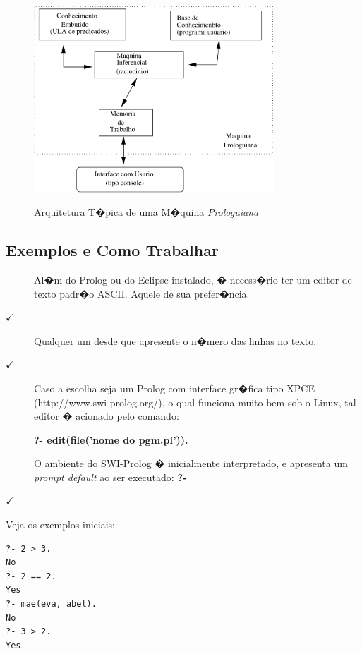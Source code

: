 \documentclass[final,a4paper]{article}
\begin{document}
\begin{figure}[!htb]
\centering
\includegraphics[height=7cm, width=9cm]{figuras/maq_prolog.pdf}
%
\label{maq_prolog}
\caption{Arquitetura T�pica de uma M�quina {\em
Prologuiana}}
\end{figure}

\newpage
\subsection {Exemplos e Como Trabalhar}


\begin{description}

\item [\checkmark ] Al�m do Prolog ou do Eclipse instalado, � necess�rio ter um editor de texto padr�o ASCII. Aquele de sua prefer�ncia.

\item [$\checkmark $] Qualquer um desde que apresente o n�mero das linhas no texto. 


\item [$\checkmark $]Caso a escolha seja um Prolog com interface gr�fica tipo XPCE (http://www.swi-prolog.org/), o qual funciona muito bem sob o Linux, tal editor � acionado pelo comando:

{\bf ?- edit(file('nome do pgm.pl')).} 

O ambiente  do SWI-Prolog � inicialmente interpretado, e
 apresenta  um {\em prompt default} ao ser executado: {\bf ?-}

\item [$\checkmark $] 
\end{description}


Veja os exemplos iniciais:
\begin{verbatim}
?- 2 > 3.
No
?- 2 == 2.
Yes
?- mae(eva, abel).
No
?- 3 > 2.
Yes
\end{verbatim}
\end{document}
